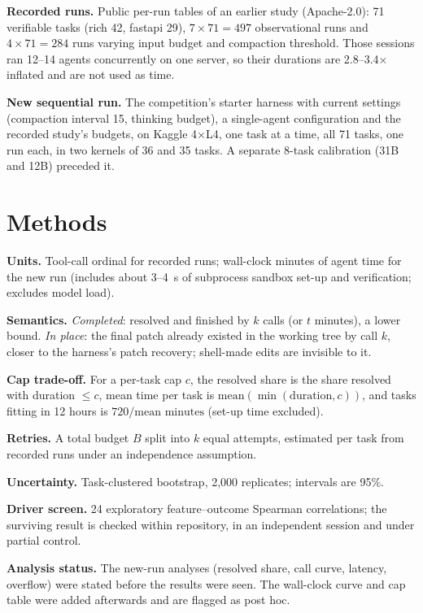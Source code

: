 \documentclass[conference]{IEEEtran}
\begin{document}
\textbf{Recorded runs.} Public per-run tables of an earlier study (Apache-2.0): 71 verifiable tasks (rich 42, fastapi 29), $7\times71=497$ observational runs and $4\times71=284$ runs varying input budget and compaction threshold. Those sessions ran 12--14 agents concurrently on one server, so their durations are 2.8--3.4$\times$ inflated and are not used as time.

\textbf{New sequential run.} The competition's starter harness with current settings (compaction interval 15, thinking budget), a single-agent configuration and the recorded study's budgets, on Kaggle 4$\times$L4, one task at a time, all 71 tasks, one run each, in two kernels of 36 and 35 tasks. A separate 8-task calibration (31B and 12B) preceded it.

\section{Methods}
\textbf{Units.} Tool-call ordinal for recorded runs; wall-clock minutes of agent time for the new run (includes about 3--4~s of subprocess sandbox set-up and verification; excludes model load).

\textbf{Semantics.} \emph{Completed}: resolved and finished by $k$ calls (or $t$ minutes), a lower bound. \emph{In place}: the final patch already existed in the working tree by call $k$, closer to the harness's patch recovery; shell-made edits are invisible to it.

\textbf{Cap trade-off.} For a per-task cap $c$, the resolved share is the share resolved with duration $\le c$, mean time per task is $\mathrm{mean}(\min(\text{duration},c))$, and tasks fitting in 12 hours is $720/\text{mean minutes}$ (set-up time excluded).

\textbf{Retries.} A total budget $B$ split into $k$ equal attempts, estimated per task from recorded runs under an independence assumption.

\textbf{Uncertainty.} Task-clustered bootstrap, 2,000 replicates; intervals are 95\%.

\textbf{Driver screen.} 24 exploratory feature--outcome Spearman correlations; the surviving result is checked within repository, in an independent session and under partial control.

\textbf{Analysis status.} The new-run analyses (resolved share, call curve, latency, overflow) were stated before the results were seen. The wall-clock curve and cap table were added afterwards and are flagged as post hoc.
\end{document}
